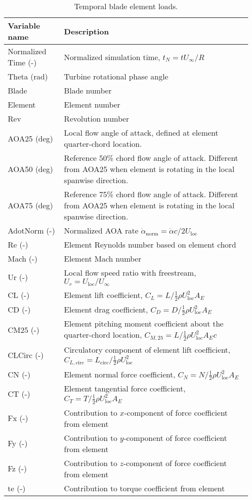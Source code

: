 \begin{table}[!htbp]
\centering
\caption{Temporal blade element loads.}
\label{tbl:output_vars_blade}
\begin{tabular}{p{}p{}}
\toprule
Variable name & Description \\ \midrule
Normalized Time (-) & Normalized simulation time, $t_N=t U_\infty/R$ \\
Theta (rad)         & Turbine rotational phase angle \\
Blade               & Blade number \\
Element             & Element number \\
Rev                 & Revolution number \\
AOA25 (deg)         & Local flow angle of attack, defined at element quarter-chord location. \\
AOA50 (deg)         & Reference 50\% chord flow angle of attack. Different from AOA25 when element is rotating in the local spanwise direction. \\
AOA75 (deg)         & Reference 75\% chord flow angle of attack. Different from AOA25 when element is rotating in the local spanwise direction. \\
AdotNorm (-)        & Normalized AOA rate  $\dot{\alpha}_\textrm{norm} = \dot{\alpha} c / 2 U_\textrm{loc}$ \\ 
Re (-)              & Element Reynolds number based on element chord \\
Mach (-)            & Element Mach number \\
Ur (-)              & Local flow speed ratio with freestream, $U_r = U_\textrm{loc}/U_\infty$ \\ 
CL (-)              & Element lift coefficient, $C_L=L/{\frac{1}{2} \rho U_\textrm{loc}^2 A_E}$ \\
CD (-)              & Element drag coefficient, $C_D=D/{\frac{1}{2} \rho U_\textrm{loc}^2 A_E}$ \\
CM25 (-)            & Element pitching moment coefficient about the quarter-chord location, $C_{M,25}=L/{\frac{1}{2} \rho U_\textrm{loc}^2 A_E c}$ \\
CLCirc (-)          & Circulatory component of element lift coefficient, $C_{L,\textrm{circ}}={L_\textrm{circ}}/{\frac{1}{2} \rho U_\textrm{loc}^2}$ \\
CN (-)              & Element normal force coefficient, $C_N = {N}/{\frac{1}{2} \rho U_\textrm{loc}^2 A_E}$ \\ 
CT (-)              & Element tangential force coefficient, $C_T = {T}/{\frac{1}{2} \rho U_\textrm{loc}^2 A_E}$ \\
Fx (-)              & Contribution to $x$-component of force coefficient from element \\
Fy (-)              & Contribution to $y$-component of force coefficient from element \\
Fz (-)              & Contribution to $z$-component of force coefficient from element \\
te (-)              & Contribution to torque coefficient from element \\
\bottomrule
\end{tabular}
\end{table}

